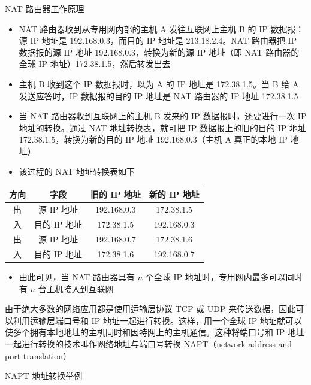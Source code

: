 \documentclass[cs4size,a4paper,10pt]{ctexart}
\begin{document}
	NAT 路由器工作原理
	\begin{itemize}
		\item 
		\begin{sloppypar}
			NAT 路由器收到从专用网内部的主机 A 发往互联网上主机 B 的 IP 数据报：源 IP 地址是 192.168.0.3，而目的 IP 地址是 213.18.2.4。NAT 路由器把 IP 数据报的源 IP 地址 192.168.0.3，转换为新的源 IP 地址（即 NAT 路由器的全球 IP 地址）172.38.1.5，然后转发出去
		\end{sloppypar}
		\item 主机 B 收到这个 IP 数据报时，以为 A 的 IP 地址是 172.38.1.5。当 B 给 A 发送应答时，IP 数据报的目的 IP 地址是 NAT 路由器的 IP 地址 172.38.1.5
		\item 当 NAT 路由器收到互联网上的主机 B 发来的 IP 数据报时，还要进行一次 IP 地址的转换。通过 NAT 地址转换表，就可把 IP 数据报上的旧的目的 IP 地址 172.38.1.5，转换为新的目的 IP 地址 192.168.0.3（主机 A 真正的本地 IP 地址）
		\item 该过程的 NAT 地址转换表如下
	\end{itemize}

	\begin{table}[H]
		\centering
		\begin{tabular}{|c|c|c|c|}
		\hline
		方向 & 字段       & 旧的 IP 地址    & 新的 IP 地址    \\ \hline
		出  & 源 IP 地址  & 192.168.0.3 & 172.38.1.5  \\ \hline
		入  & 目的 IP 地址 & 172.38.1.5  & 192.168.0.3 \\ \hline
		出  & 源 IP 地址  & 192.168.0.7 & 172.38.1.6  \\ \hline
		入  & 目的 IP 地址 & 172.38.1.6  & 192.168.0.7 \\ \hline
		\end{tabular}
	\end{table}

	\begin{itemize}
		\item 由此可见，当 NAT 路由器具有 $n$ 个全球 IP 地址时，专用网内最多可以同时有 $n$ 台主机接入到互联网
	\end{itemize}

	由于绝大多数的网络应用都是使用运输层协议 TCP 或 UDP 来传送数据，因此可以利用运输层端口号和 IP 地址一起进行转换。这样，用一个全球 IP 地址就可以使多个拥有本地地址的主机同时和因特网上的主机通信。这种将端口号和 IP 地址一起进行转换的技术叫作网络地址与端口号转换 NAPT（network address and port translation）

	NAPT 地址转换举例
\end{document}
